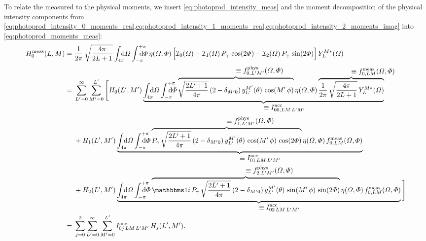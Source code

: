 To relate the measured to the physical moments, we insert
\cref{eq:photoprod_intensity_meas} and the moment decomposition of the
physical intensity components from
\cref{eq:photoprod_intensity_0_moments_real,eq:photoprod_intensity_1_moments_real,eq:photoprod_intensity_2_moments_imag}
into \cref{eq:photoprod_moments_meas}:
\begin{align}
  H_0^\text{meas}(L, M)
  ={}& \frac{1}{2 \pi}\, \sqrt{\frac{4 \pi}{2 L + 1}} \int_{4 \pi}\!\!\!\! \dif{\Omega} \int_{-\pi}^{+\pi}\hspace{-1.2em} \dif{\Phi}\,
  \eta(\Omega, \Phi) \sBrk[2]{\intensity_0(\Omega)
  - \intensity_1(\Omega)\, P_\gamma\, \cos(2 \Phi)
  - \intensity_2(\Omega)\, P_\gamma\, \sin(2 \Phi)}
  Y_L^{M *}(\Omega) \nonumber
  \\
  ={}& \sum_{L' = 0}^\infty \sum_{M' = 0}^{L'} \Bigg[
  H_0(L', M')\,
  \rdUnderbrace{\int_{4 \pi}\!\!\!\! \dif{\Omega} \int_{-\pi}^{+\pi}\hspace{-1.2em} \dif{\Phi}\,
  \rdOverbrace{\sqrt{\frac{2 L' + 1}{4 \pi}}\, (2 - \delta_{M' 0})\, y_{L'}^{M'}(\theta)\, \cos(M'\, \phi)\vphantom{\frac{Y_L^M}{\sqrt{L}}}}{\equiv f_{0, L' M'}^\text{phys}(\Omega, \Phi)}\,
  \eta(\Omega, \Phi)\,
  \rdOverbrace{\frac{1}{2 \pi}\, \sqrt{\frac{4 \pi}{2 L + 1}}\, Y_L^{M *}(\Omega)}{\equiv f_{0, L M}^\text{meas}(\Omega, \Phi)}}%
  {\equiv I^\text{acc}_{0 0, L M\, L' M'}} \nonumber
  \\
  & + H_1(L', M')\,
  \rdUnderbrace{\int_{4 \pi}\!\!\!\! \dif{\Omega} \int_{-\pi}^{+\pi}\hspace{-1.2em} \dif{\Phi}\,
  \rdOverbrace{P_\gamma\, \sqrt{\frac{2 L' + 1}{4 \pi}}\, (2 - \delta_{M' 0})\, y_{L'}^{M'}(\theta)\, \cos(M'\, \phi)\, \cos(2 \Phi)}{\equiv f_{1, L' M'}^\text{phys}(\Omega, \Phi)}\,
  \eta(\Omega, \Phi)\,
  f_{0, L M}^\text{meas}(\Omega, \Phi)}%
  {\equiv I^\text{acc}_{0 1\, L M\, L' M'}} \nonumber
  \\
  & + H_2(L', M')\,
  \rdUnderbrace{\int_{4 \pi}\!\!\!\! \dif{\Omega} \int_{-\pi}^{+\pi}\hspace{-1.2em} \dif{\Phi}\,
  \rdOverbrace{\imag\, P_\gamma\, \sqrt{\frac{2 L' + 1}{4 \pi}}\, (2 - \delta_{M' 0})\, y_{L'}^{M'}(\theta)\, \sin(M'\, \phi)\, \sin(2 \Phi)}{\equiv f_{2, L' M'}^\text{phys}(\Omega, \Phi)}\,
  \eta(\Omega, \Phi)\,
  f_{0, L M}^\text{meas}(\Omega, \Phi)}%
  {\equiv I^\text{acc}_{0 2\, L M\, L' M'}}\, \Bigg] \nonumber
  \\
  \label{eq:photoprod_moment_0_meas2}
  ={}& \sum_{j = 0}^2 \sum_{L' = 0}^\infty \sum_{M' = 0}^{L'}
  I^\text{acc}_{0 j\, L M\, L' M'}\, H_j(L', M').
\end{align}
